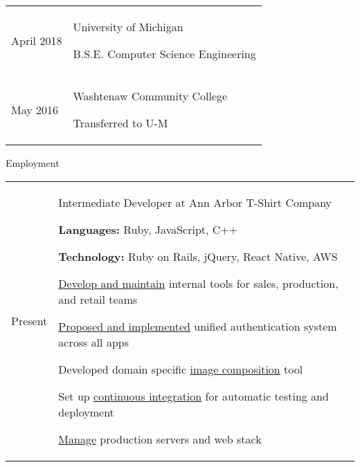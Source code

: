 \documentclass[12pt]{article}
\renewcommand{\section}[1]{{\Huge{#1}}\vspace{2 mm}}
\newenvironment{timeline}
        {\begin{tabular}{p{21 mm}|p{150 mm}}}
        {\end{tabular}}
\newenvironment{timelinetitle}
        {\vspace{-2 mm}\begin{large}}
        {\end{large}\vspace{-1.5 mm}}
\newcommand{\timespan}[2]{{#2}\newline{#1}}
\newcommand{\resumeitem}{\newline\vspace{3 mm}\hspace{3 mm}}
\newcommand{\resumestart}{\vspace{1 mm}}
\begin{document}
\begin{timeline}
\timespan{Sept. 2016}{April 2018}
&
\begin{timelinetitle}
    University of Michigan
\end{timelinetitle}
\hspace{16mm}
B.S.E. Computer Science Engineering
\vspace{3 mm}

\\

\timespan{Sept. 2012}{May 2016}
&
\begin{timelinetitle}
    Washtenaw Community College
\end{timelinetitle}
\hspace{29mm}
Transferred to U-M

\end{timeline}

\vspace{3.0 mm}
\section{Employment}
\hline

\begin{timeline}
\timespan{Feb. 2014}{Present}
&
\begin{timelinetitle}
    Intermediate Developer at Ann Arbor T-Shirt Company
\end{timelinetitle}
\resumestart

\resumeitem \textbf{Languages:} Ruby, JavaScript, C++

\resumeitem \textbf{Technology:} Ruby on Rails, jQuery, React Native, AWS

\resumeitem \underline{Develop and maintain} internal tools for sales, production, and retail teams

\resumeitem \underline{Proposed and implemented} unified authentication system across all apps

\resumeitem Developed domain specific \underline{image composition} tool

\resumeitem Set up \underline{continuous integration} for automatic testing and deployment

\resumeitem \underline{Manage} production servers and web stack

\end{timeline}
\end{document}
